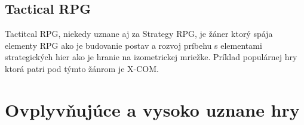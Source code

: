 \documentclass [10pt, twoside, slovak, a4paper] {article}
\begin{document}
\subsection{Tactical RPG}
Tactitcal RPG, niekedy uznane aj za Strategy RPG, je žáner ktorý spája elementy RPG ako je budovanie postav a rozvoj príbehu s elementami strategických hier ako je hranie na izometrickej mriežke. Príklad populárnej hry ktorá patri pod týmto žánrom je X-COM.


\section {Ovplyvňujúce a vysoko uznane hry}

\nocite{*}


\end{document}
